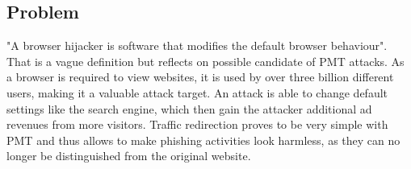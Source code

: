 \subsection{Problem}
"A browser hijacker is software that modifies the default browser behaviour"\cite{automatedspywarecollection}. That is a  vague definition but reflects on possible candidate of \gls{PMT} attacks. As a browser is required to view websites, it is used by over three billion \cite{cia} different users, making it a valuable attack target. An attack is able to change default settings like the search engine, which then gain the attacker additional ad revenues from more visitors. Traffic redirection proves to be very simple with \gls{PMT} and thus allows to make phishing activities look harmless, as they can no longer be distinguished from the original website.